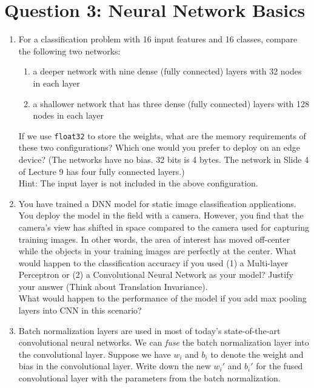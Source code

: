 \documentclass[12pt]{article}
\begin{document}
\section*{Question 3: Neural Network Basics }
\begin{enumerate}
    \item For a classification problem with 16 input features and 16 classes, compare the following two networks:
    \begin{enumerate}
        \item a deeper network with nine dense (fully connected) layers with 32 nodes in each layer
        \item a shallower network that has three dense (fully connected) layers with 128 nodes in each layer
    \end{enumerate} 
    If we use \texttt{float32} to store the weights, what are the memory requirements of these two configurations? Which one would you prefer to deploy on an edge device? (The networks have no bias. 32 bits is 4 bytes. The network in Slide 4 of Lecture 9 has four fully connected layers.) \\
    Hint: The input layer is not included in the above configuration. \\
    
    \item You have trained a DNN model for static image classification applications. You deploy the model in the field with a camera. However, you find that the camera’s view has shifted in space compared to the camera used for capturing training images. In other words, the area of interest has moved off-center while the objects in your training images are perfectly at the center. What would happen to the classification accuracy if you used (1) a Multi-layer Perceptron or (2) a Convolutional Neural Network as your model? Justify your answer (Think about Translation Invariance). \\What would happen to the performance of the model if you add max pooling layers into CNN in this scenario? \\
    
    \item Batch normalization layers are used in most of today’s state-of-the-art convolutional neural networks. We can \textit{fuse} the batch normalization layer into the convolutional layer. Suppose we have $w_i$ and $b_i$ to denote the weight and bias in the convolutional layer. Write down the new $w_i'$ and $b_i'$ for the fused convolutional layer with the parameters from the batch normalization. \\


\end{enumerate}
\end{document}
